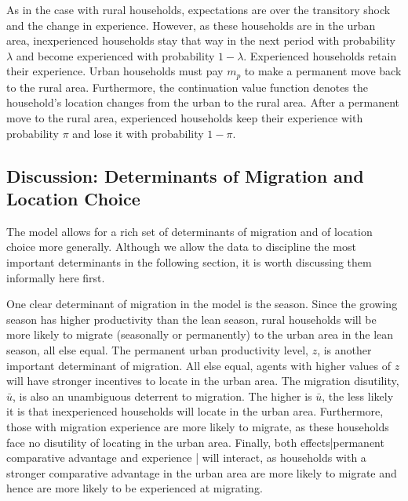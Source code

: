 \documentclass[12pt,pdftex]{article}
\begin{document}
As in the case with rural households, expectations are over the transitory shock and the change in experience. However, as these households are in the urban area, inexperienced households stay that way in the next period with probability $\lambda$ and become experienced with probability $1-\lambda$. Experienced households retain their experience. Urban households must pay $m_p$ to make a permanent move back to the rural area. Furthermore, the continuation value function denotes the household's location changes from the urban to the rural area. After a permanent move to the rural area, experienced households keep their experience with probability $\pi$ and lose it with probability $1-\pi$.

\subsection{Discussion: Determinants of Migration and Location Choice}\label{sec:discussion}

The model allows for a rich set of determinants of migration and of location choice more generally. Although we allow the data to discipline the most important determinants in the following section, it is worth discussing them informally here first.

One clear determinant of migration in the model is the season. Since the growing season has higher productivity than the lean season, rural households will be more likely to migrate (seasonally or permanently) to the urban area in the lean season, all else equal. The permanent urban productivity level, $z$, is another important determinant of migration. All else equal, agents with higher values of $z$ will have stronger incentives to locate in the urban area. The migration disutility, $\bar u$, is also an unambiguous deterrent to migration. The higher is $\bar u$, the less likely it is that inexperienced households will locate in the urban area. Furthermore, those with migration experience are more likely to migrate, as these households face no disutility of locating in the urban area. Finally, both effects|permanent comparative advantage and experience | will interact, as households with a stronger comparative advantage in the urban area are more likely to migrate and hence are more likely to be experienced at migrating.
\end{document}
